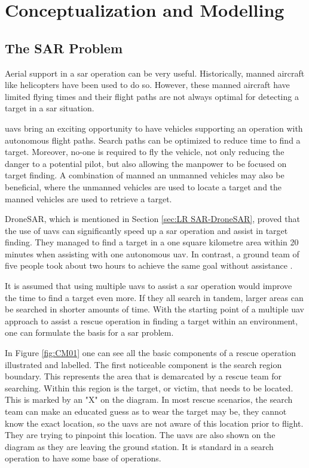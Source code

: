 \chapter{Conceptualization and Modelling}



\section{The SAR Problem}
Aerial support in a \ac{sar} operation can be very useful. Historically, manned aircraft like helicopters have been used to do so. However, these manned aircraft have limited flying times and their flight paths are not always optimal for detecting a target in a \ac{sar} situation.

\acp{uav} bring an exciting opportunity to have vehicles supporting an operation with autonomous flight paths. Search paths can be optimized to reduce time to find a target. Moreover, no-one is required to fly the vehicle, not only reducing the danger to a potential pilot, but also allowing the manpower to be focused on target finding. A combination of manned an unmanned vehicles may also be beneficial, where the unmanned vehicles are used to locate a target and the manned vehicles are used to retrieve a target.

DroneSAR, which is mentioned in Section \ref{sec:LR SAR-DroneSAR}, proved that the use of \acp{uav} can significantly speed up a \ac{sar} operation and assist in target finding. They managed to find a target in a one square kilometre area within 20 minutes when assisting with one autonomous \ac{uav}. In contrast, a ground team of five people took about two hours to achieve the same goal without assistance \cite{DroneSAR01}.

It is assumed that using multiple \acp{uav} to assist a \ac{sar} operation would improve the time to find a target even more. If they all search in tandem, larger areas can be searched in shorter amounts of time. With the starting point of a multiple \ac{uav} approach to assist a rescue operation in finding a target within an environment, one can formulate the basis for a \ac{sar} problem.

In Figure \ref{fig:CM01} one can see all the basic components of a rescue operation illustrated and labelled. The first noticeable component is the search region boundary. This represents the area that is demarcated by a rescue team for searching. Within this region is the target, or victim, that needs to be located. This is marked by an "X" on the diagram. 
In most rescue scenarios, the search team can make an educated guess as to wear the target may be, they cannot know the exact location, so the \acp{uav} are not aware of this location prior to flight. They are trying to pinpoint this location. The \acp{uav} are also shown on the diagram as they are leaving the ground station. It is standard in a search operation to have some base of operations. 

